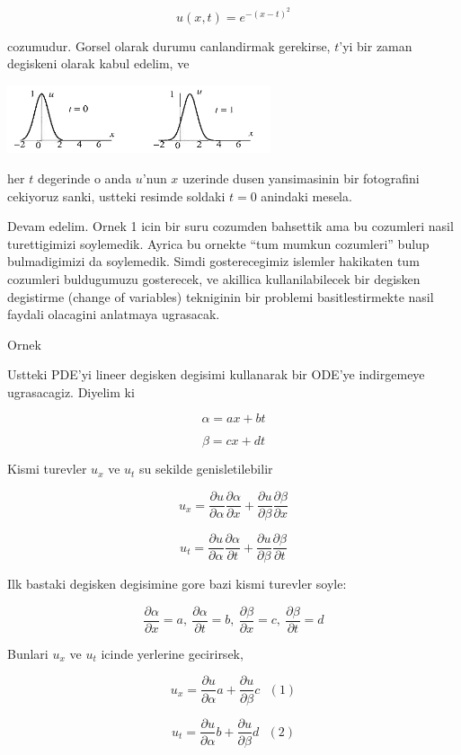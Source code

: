 \documentclass[12pt,fleqn]{article}
\begin{document}
\[ u(x,t) =  e^{-(x-t)^2} \]

cozumudur. Gorsel olarak durumu canlandirmak gerekirse, $t$'yi bir zaman
degiskeni olarak kabul edelim, ve 

\includegraphics[height=2cm]{1_3.png}

her $t$ degerinde o anda $u$'nun $x$ uzerinde dusen yansimasinin bir
fotografini cekiyoruz sanki, ustteki resimde soldaki $t=0$ anindaki
mesela. 

Devam edelim. Ornek 1 icin bir suru cozumden bahsettik ama bu cozumleri
nasil turettigimizi soylemedik. Ayrica bu ornekte ``tum mumkun cozumleri''
bulup bulmadigimizi da soylemedik. Simdi gosterecegimiz islemler hakikaten
tum cozumleri buldugumuzu gosterecek, ve akillica kullanilabilecek bir
degisken degistirme (change of variables) tekniginin bir problemi
basitlestirmekte nasil faydali olacagini anlatmaya ugrasacak. 

Ornek

Ustteki PDE'yi lineer degisken degisimi kullanarak bir ODE'ye indirgemeye
ugrasacagiz. Diyelim ki

\[ \alpha = a x + b t \]

\[ \beta = cx + dt \]

Kismi turevler $u_x$ ve $u_t$ su sekilde genisletilebilir

\[ u_x = 
\frac{\partial u}{\partial \alpha}\frac{\partial \alpha}{\partial x}  +
\frac{\partial u}{\partial \beta}\frac{\partial \beta}{\partial x} 
\]


\[ u_t = 
\frac{\partial u}{\partial \alpha}\frac{\partial \alpha}{\partial t}  +
\frac{\partial u}{\partial \beta}\frac{\partial \beta}{\partial t} 
\]

Ilk bastaki degisken degisimine gore bazi kismi turevler soyle:

\[ \frac{\partial \alpha}{\partial x} = a , \ \frac{\partial \alpha}{\partial t} = b, \ \frac{\partial \beta}{\partial x} = c , \
\frac{\partial \beta}{\partial t} = d 
\]

Bunlari $u_x$ ve $u_t$ icinde yerlerine gecirirsek,

\[ u_x = 
\frac{\partial u}{\partial \alpha} a +
\frac{\partial u}{\partial \beta} c
\ \ \ (1)
\]

\[ u_t = 
\frac{\partial u}{\partial \alpha} b +
\frac{\partial u}{\partial \beta} d
\ \ \ (2)
\]
\end{document}
